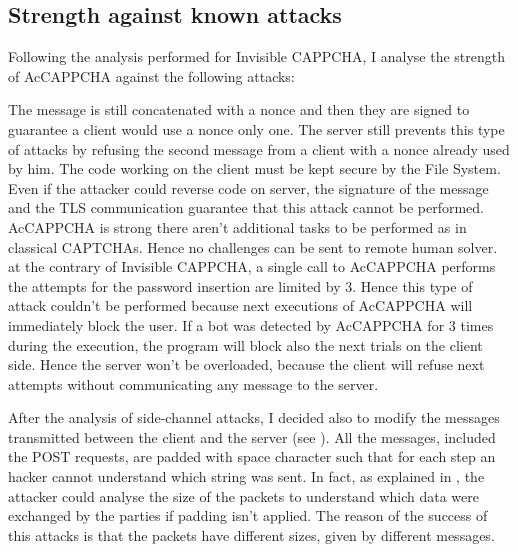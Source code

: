 \subsection{Strength against known attacks}\label{Results:attacks}
Following the analysis performed for Invisible CAPPCHA\cite{Invisible_CAPPCHA}, I analyse the strength of AcCAPPCHA against the following attacks:
\begin{itemize}
{The message is still concatenated with a nonce and then they are signed to guarantee a client would use a nonce only one. The server still prevents this type of attacks by refusing the second message from a client with a nonce already used by him.}
{The code working on the client must be kept secure by the File System. Even if the attacker could reverse code on server, the signature of the message and the TLS communication guarantee that this attack cannot be performed.}
{AcCAPPCHA is strong there aren't additional tasks to be performed as in classical CAPTCHAs. Hence no challenges can be sent to remote human solver.}
{at the contrary of Invisible CAPPCHA, a single call to AcCAPPCHA performs the attempts for the password insertion are limited by 3. Hence this type of attack couldn't be performed because next executions of AcCAPPCHA will immediately block the user.
}
{If a bot was detected by AcCAPPCHA for 3 times during the execution, the program will block also the next trials on the client side. Hence the server won't be overloaded, because the client will refuse next attempts without communicating any message to the server.}
\end{itemize}
After the analysis of side-channel attacks, I decided also to modify the messages transmitted between the client and the server (see ). All the messages, included the POST requests, are padded with space character such that for each step an hacker cannot understand which string was sent. In fact, as explained in , the attacker could analyse the size of the packets to understand which data were exchanged by the parties if padding isn't applied. The reason of the success of this attacks is that the packets have different sizes, given by different messages.

